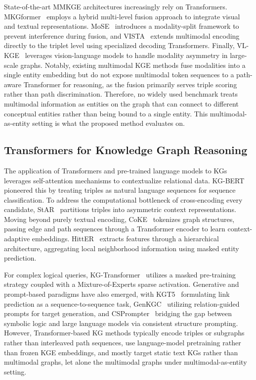 \documentclass[runningheads]{llncs}
\begin{document}
State-of-the-art MMKGE architectures increasingly rely on Transformers. MKGformer~\cite{chen2022mkgformer} employs a hybrid multi-level fusion approach to integrate visual and textual representations. MoSE~\cite{zhao2022mose} introduces a modality-split framework to prevent interference during fusion, and VISTA~\cite{lee2023vista} extends multimodal encoding directly to the triplet level using specialized decoding Transformers. Finally, VL-KGE~\cite{efthymiou2026vlkge} leverages vision-language models to handle modality asymmetry in large-scale graphs. Notably, existing multimodal KGE methods fuse modalities into a single entity embedding but do not expose multimodal token sequences to a path-aware Transformer for reasoning, as the fusion primarily serves triple scoring rather than path discrimination. Therefore, no widely used benchmark treats multimodal information as entities on the graph that can connect to different conceptual entities rather than being bound to a single entity. This multimodal-as-entity setting is what the proposed method evaluates on.

\subsection{Transformers for Knowledge Graph Reasoning}
\label{sec:rw-transformers}

The application of Transformers and pre-trained language models to KGs leverages self-attention mechanisms to contextualize relational data. KG-BERT~\cite{yao2019kg} pioneered this by treating triples as natural language sequences for sequence classification. To address the computational bottleneck of cross-encoding every candidate, StAR~\cite{wang2021star} partitions triples into asymmetric context representations. Moving beyond purely textual encoding, CoKE~\cite{wang2019coke} tokenizes graph structures, passing edge and path sequences through a Transformer encoder to learn context-adaptive embeddings. HittER~\cite{chen2021hitter} extracts features through a hierarchical architecture, aggregating local neighborhood information using masked entity prediction.

For complex logical queries, KG-Transformer~\cite{liu2022mask} utilizes a masked pre-training strategy coupled with a Mixture-of-Experts sparse activation. Generative and prompt-based paradigms have also emerged, with KGT5~\cite{saxena2022kgt5} formulating link prediction as a sequence-to-sequence task, GenKGC~\cite{zhu2022genkgc} utilizing relation-guided prompts for target generation, and CSPrompter~\cite{chen2023csprompter} bridging the gap between symbolic logic and large language models via consistent structure prompting. However, Transformer-based KG methods typically encode triples or subgraphs rather than interleaved path sequences, use language-model pretraining rather than frozen KGE embeddings, and mostly target static text KGs rather than multimodal graphs, let alone the multimodal graphs under multimodal-as-entity setting.
\end{document}
